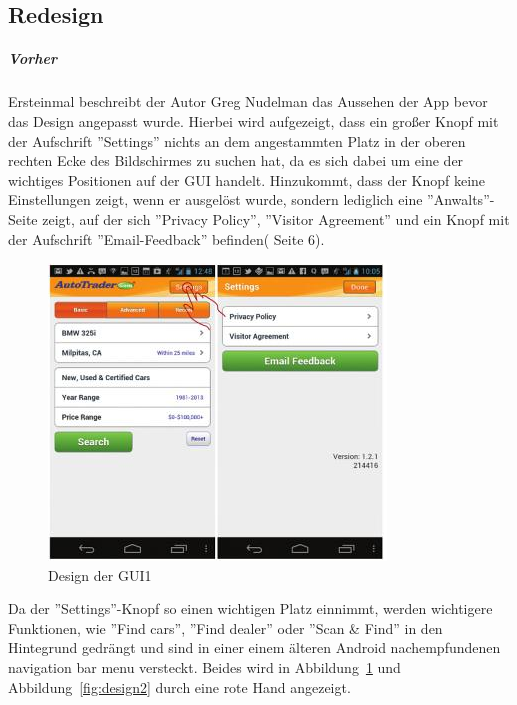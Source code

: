 \subsection{Redesign}
\label{sub:actionbars}

\subparagraph{Vorher}
\label{subp:vorher}
Ersteinmal beschreibt der Autor Greg Nudelman das Aussehen der App bevor das Design angepasst wurde. Hierbei wird aufgezeigt, dass ein großer Knopf mit der Aufschrift ''Settings'' nichts an dem angestammten Platz in der oberen rechten Ecke des Bildschirmes zu suchen hat, da es sich dabei um eine der wichtiges Positionen auf der GUI handelt. Hinzukommt, dass der Knopf keine Einstellungen zeigt, wenn er ausgelöst wurde, sondern lediglich eine ''Anwalts''-Seite zeigt, auf der sich ''Privacy Policy'', ''Visitor Agreement'' und ein Knopf mit der Aufschrift ''Email-Feedback'' befinden(\cite{AndroidDesignPatterns} Seite 6).\\

\begin{figure}[h]
 \centering
 \includegraphics[height=0.40\textheight]{img/Design1.png}
 \caption{Design der GUI1}
 \label{fig:design1}
\end{figure}

Da der ''Settings''-Knopf so einen wichtigen Platz einnimmt, werden wichtigere Funktionen, wie ''Find cars'', ''Find dealer'' oder ''Scan \& Find'' in den Hintegrund gedrängt und sind in einer einem älteren Android nachempfundenen navigation bar menu versteckt. Beides wird in Abbildung~\ref{fig:design1} und Abbildung~\ref{fig:design2} durch eine rote Hand angezeigt.

